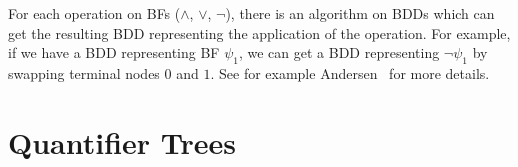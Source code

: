 \documentclass[
  digital, %
  twoside, %
  table,   %
  nolof,     %
  nolot,     %
]{fithesis3}
\theoremstyle{definition}
\newtheorem{example}{Example}
\theoremstyle{remark}
\newcommand{\evars}[1]{V_{#1}^{\exists}}
\newcommand{\uvars}[1]{V_{#1}^{\forall}}
\begin{document}



For each operation on BFs (${\land}$, ${\lor}$, ${\neg}$), there is an algorithm on BDDs which can get the resulting BDD representing the application of the operation. For example, if we have a BDD representing BF $\psi_1$, we can get a BDD representing $\neg \psi_1$ by swapping terminal nodes $0$ and $1$. See for example Andersen~\cite{BDDdetails} for more details. %



\section{Quantifier Trees}


\newcommand{\qtlabel}[1]{l({#1})}
\newcommand{\prefix}[1]{Q({#1})}
\newcommand{\eprefix}[1]{Q_{\exists}(#1)}
\newcommand{\uprefix}[1]{Q_{\forall}(#1)}
\newcommand{\children}[1]{children({#1})}
\end{document}
